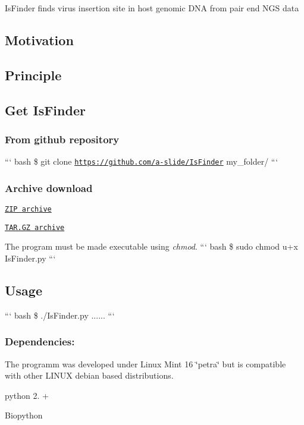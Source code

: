 Is\-Finder finds virus insertion site in host genomic D\-N\-A from pair end N\-G\-S data

\subsection*{Motivation}

\subsection*{Principle}

\subsection*{Get Is\-Finder}

\subsubsection*{From github repository}

``` bash \$ git clone \href{https://github.com/a-slide/IsFinder}{\tt https\-://github.\-com/a-\/slide/\-Is\-Finder} my\-\_\-folder/ ```

\subsubsection*{Archive download}


\begin{DoxyItemize}
\item \href{https://github.com/a-slide/IsFinder/archive/master.zip}{\tt Z\-I\-P archive}
\item \href{https://github.com/a-slide/IsFinder/tarball/master}{\tt T\-A\-R.\-G\-Z archive}
\end{DoxyItemize}

The program must be made executable using {\itshape chmod}. ``` bash \$ sudo chmod u+x Is\-Finder.\-py ```

\subsection*{Usage}

``` bash \$ ./\-Is\-Finder.py ...... ```

\subsubsection*{Dependencies\-:}

The programm was developed under Linux Mint 16 \char`\"{}petra\char`\"{} but is compatible with other L\-I\-N\-U\-X debian based distributions.
\begin{DoxyItemize}
\item python 2. +
\item Biopython
\end{DoxyItemize}

